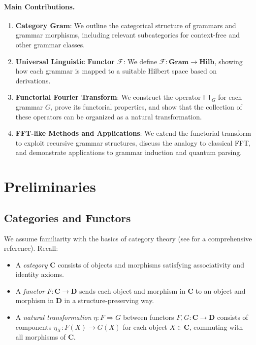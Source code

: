 \documentclass[11pt]{article}
\begin{document}
\paragraph{Main Contributions.}
\begin{enumerate}
    \item \textbf{Category \(\mathbf{Gram}\)}: We outline the categorical structure of grammars and grammar morphisms, including relevant subcategories for context-free and other grammar classes.
    \item \textbf{Universal Linguistic Functor \(\mathcal{F}\)}: We define \(\mathcal{F} : \mathbf{Gram} \to \mathbf{Hilb}\), showing how each grammar is mapped to a suitable Hilbert space based on derivations.
    \item \textbf{Functorial Fourier Transform}: We construct the operator \(\mathsf{FT}_G\) for each grammar \(G\), prove its functorial properties, and show that the collection of these operators can be organized as a natural transformation.
    \item \textbf{FFT-like Methods and Applications}: We extend the functorial transform to exploit recursive grammar structures, discuss the analogy to classical FFT, and demonstrate applications to grammar induction and quantum parsing.
\end{enumerate}

\section{Preliminaries}

\subsection{Categories and Functors}

We assume familiarity with the basics of category theory (see \cite{maclane} for a comprehensive reference). Recall:
\begin{itemize}
    \item A \emph{category} \(\mathbf{C}\) consists of objects and morphisms satisfying associativity and identity axioms.
    \item A \emph{functor} \(F : \mathbf{C} \to \mathbf{D}\) sends each object and morphism in \(\mathbf{C}\) to an object and morphism in \(\mathbf{D}\) in a structure-preserving way.
    \item A \emph{natural transformation} \(\eta : F \Rightarrow G\) between functors \(F, G : \mathbf{C} \to \mathbf{D}\) consists of components \(\eta_X : F(X) \to G(X)\) for each object \(X\in \mathbf{C}\), commuting with all morphisms of \(\mathbf{C}\).
\end{itemize}
\end{document}
